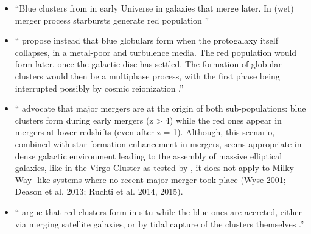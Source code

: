 \documentclass[a4paper,fleqn,usenatbib]{mnras}
\begin{document}
 


\begin{itemize}
    \item ``Blue clusters from in early Universe in galaxies that merge later. In (wet) merger process starbursts generate red population \cite{1992ApJ...384...50A, 1987nngp.proc...18S}''
    \item ``\citet{1997AJ....113.1652F} propose instead that blue globulars form when the protogalaxy itself collapses, in a metal-poor and turbulence media. The red population would form later, once the galactic disc has settled. The formation of globular clusters would then be a multiphase process, with the first phase being interrupted possibly by cosmic reionization \citep{2002MNRAS.333..383B}.''
    \item ``\citet{2005ApJ...623..650K, 2014ApJ...796...10L} advocate
that major mergers are at the origin of both sub-populations: blue
clusters form during early mergers (z > 4) while the red ones appear
in mergers at lower redshifts (even after z = 1). Although, this
scenario, combined with star formation enhancement in mergers,
seems appropriate in dense galactic environment leading to the
assembly of massive elliptical galaxies, like in the Virgo Cluster
as tested by \citet{2014ApJ...796...10L}, it does not apply to Milky Way-
like systems where no recent major merger took place (Wyse 2001;
Deason et al. 2013; Ruchti et al. 2014, 2015).
\item ``\citet{1998ApJ...501..554C} argue that red clusters form in situ while the blue ones are accreted, either via merging satellite galaxies, or by tidal capture of the clusters themselves \citep[see also][]{2013ApJ...762...39T}.''
\end{itemize}
\end{document}
